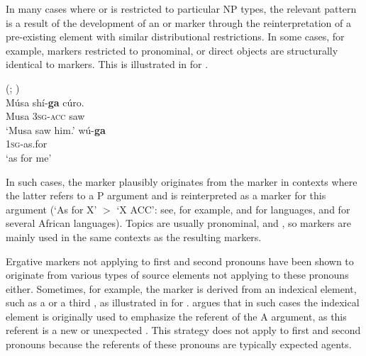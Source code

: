 \documentclass[output=paper]{langsci/langscibook}
\begin{document}
In many cases where  or   is restricted to
particular NP types, the relevant  pattern is a result of the
development of an  or 
marker through the reinterpretation of a pre-existing
element with similar distributional restrictions.  In some cases, for example,  markers restricted
to pronominal,  or   direct objects are 
structurally identical to  markers. This is illustrated  in
 for . 


\ea\label{kanuri}
 (; )\\
\ea
  \gll Músa sh{í}-\textbf{{ga}} cúro.\\
  Musa 3\textsc{sg-acc} saw\\
  \glt `Musa saw him.' 
  \ex
  \gll wú-\textbf{{ga}}\\
  1\textsc{sg}-as.for\\
  \glt `as for me' 

\z
\z

In such cases, the  marker
plausibly originates from the 
marker in contexts where the latter refers to a P argument and  is
reinterpreted as a marker for this argument (`As for X' $>$ `X ACC': see, for example, \citealt{Rohlfs1984} and \citealt{Pensado1995} for 
languages, and \citealt{Konig2008} for several African languages). 
Topics are usually pronominal,  and
, so  markers
are mainly used in the same contexts as the resulting 
markers. 

Ergative 
\label{p:cristofaro:ergatives}
markers not applying to first and second 
pronouns have been shown to originate
from various types of source elements not applying to these pronouns
either. Sometimes, for example,  the  marker is derived from an indexical
element, such as a  or a third  , as
illustrated in  for .
\citet{McGregor2006,McGregor2008} argues that in such cases the indexical
element is
originally used to emphasize the referent of the A argument, as this
referent is a new or unexpected . This strategy does not
    apply to  first and second  pronouns because the referents
    of these pronouns are typically expected agents.
\end{document}
